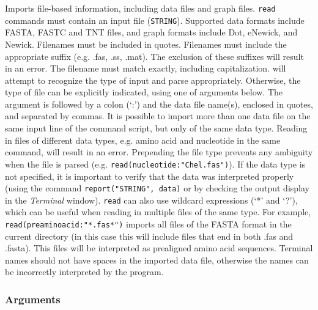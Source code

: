 	\begin{phygdescription}
		{Imports file-based information, including data files and graph files. \texttt{read} 
		commands must contain an input file (\texttt{STRING}). Supported data formats 
		include FASTA, FASTC and TNT files, and graph formats include Dot, eNewick, %
		and Newick. Filenames must be included in quotes. Filenames must include the 
		appropriate suffix (e.g. .fas, .ss, .mat). The exclusion of these suffixes will result 
		in an error. The filename must match exactly, including capitalization. \phyg will 
		attempt to recognize the type of input and parse appropriately. Otherwise, the 
		type of file can be explicitly indicated, using one of arguments below. The argument 
		is followed by a colon (`:') and the data file name(s), enclosed in quotes, and 
		separated by commas. It is possible to import more than one data file on the 
		same input line of the command script, but only of the same data type. Reading 
		in files of different data types, e.g. amino acid and nucleotide in the same command, 
		will result in an error. Prepending the file type prevents any ambiguity when the file 
		is parsed (e.g. \texttt{read(nucleotide:"Chel.fas")}). If the data type is not specified, 
		it is important to verify that the data was interpreted properly (using the command 
		\texttt{report("STRING", data)} or by checking the output display in the 
		\textit{Terminal} window). \texttt{read} can also use wildcard expressions 
		(`*' and `?'), which can be useful when reading in multiple files of the 
		same type. For example, \texttt{read(preaminoacid:"*.fas*")} imports all files of the 
		FASTA format in the current directory (in this case this will include files that end 
		in both .fas and .fasta). This files will be interpreted as prealigned amino acid
		sequences. Terminal names should not have spaces in the imported 
		data file, otherwise the names can be incorrectly interpreted by the program.} 
	\end{phygdescription}

	\subsubsection{Arguments}
	
